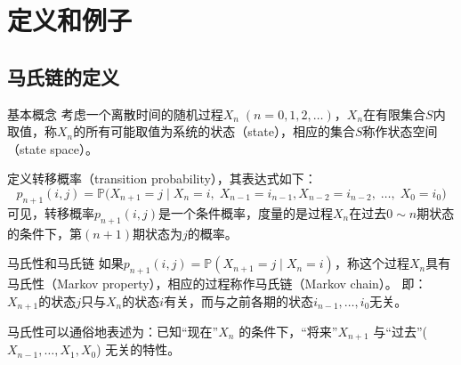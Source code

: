 \documentclass[t]{beamer}
\renewcommand{\Pr}{\mathbb{P}}
\begin{document}
\section{定义和例子}

\subsection{马氏链的定义}
\begin{frame}{基本概念}
    考虑一个离散时间的随机过程$X_n\; (n=0,1,2,\ldots)$，$X_n$在有限集合$S$内取值，称$X_n$的所有可能取值为系统的状态（state），相应的集合$S$称作状态空间（state space）。

    定义转移概率（transition probability），其表达式如下：
\[
p_{n+1}(i,j)=\Pr\big(X_{n+1}=j\;|\;{X_n=i},\; X_{n-1}=i_{n-1},X_{n-2}=i_{n-2},\;\ldots,\; X_{0}=i_{0}\big)
\]
可见，转移概率$p_{n+1}(i,j)$是一个条件概率，度量的是过程$X_n$在过去$0\sim n$期状态的条件下，第$(n+1)$期状态为$j$的概率。
\end{frame}


\begin{frame}{马氏性和马氏链}
    如果$p_{n+1}(i,j)=\Pr(X_{n+1}=j\;|\;{X_n=i})$，称这个过程$X_n$具有马氏性（Markov property），相应的过程称作马氏链（Markov chain）。
    即：$X_{n+1}$的状态$j$只与$X_n$的状态$i$有关，而与之前各期的状态$i_{n-1},\ldots,i_0$无关。

    \begin{center}
\end{center}
    
马氏性可以通俗地表述为：已知{“现在”$X_n$} 的条件下，{“将来”$X_{n+1}$} 与{“过去”($X_{n-1},\ldots,X_1,X_0$)} 无关的特性。
\end{frame}
\end{document}
